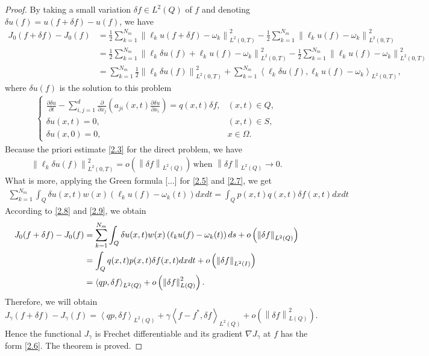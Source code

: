 \documentclass[]{article}
\begin{document}
\begin{proof}
	By taking a small variation $\delta f \in L^2(Q)$ of $f$ and denoting $\delta u(f)=u(f+\delta f)-u(f)$, we have
	\begin{align*}
		J_0(f+\delta f)-J_0(f)&=\frac{1}{2}\sum_{k=1}^{N_m}\left\|\ell_k u(f+\delta f)-\omega_k\right\|^2_{L^2(0, T)}-\frac{1}{2}\sum_{k=1}^{N_m}\left\|\ell_k u(f)-\omega_k\right\|^2_{L^2(0, T)}\\
		&=\frac{1}{2}\sum_{k=1}^{N_m}\left\|\ell_k \delta u(f) +\ell_k u(f)-\omega_k\right\|^2_{L^2(0, T)}-\frac{1}{2}\sum_{k=1}^{N_m}\left\|\ell_k u(f)-\omega_k\right\|^2_{L^2(0, T)}\\
		&=\sum_{k=1}^{N_m}\frac{1}{2}\left\|\ell_k \delta u(f)\right\|^2_{L^2(0, T)}+\sum_{k=1}^{N_m}\left\langle \ell_k \delta u(f), \ell_k u(f)-\omega_k\right\rangle_{L^2(0, T)},
	\end{align*}
	where $\delta u(f)$ is the solution to this problem
	\begin{align}\label{2.7}
		\begin{cases}
			\frac{\partial \delta u}{\partial t}-\sum\limits_{i, j=1}^{d}\frac{\partial}{\partial x_j}\left(a_{ji}(x, t)\frac{\partial \delta u}{\partial x_i}\right)=q(x, t)\delta f,&(x, t)\in Q,\\
			\delta u(x, t)=0, & (x, t)\in S,\\
			\delta u(x, 0)=0, &x\in \Omega.
		\end{cases}
	\end{align}
	Because the priori estimate \eqref{2.3} for the direct problem, we have
	\begin{align}\label{2.8}
		\left\|\ell_k\delta u(f)\right\|_{L^2(0, T)}^2=o\left(\left\|\delta f\right\|_{L^2(Q)}\right)\, \text{when } \left\|\delta f\right\|_{L^2(Q)}\to 0.
	\end{align}
	What is more, applying the Green formula [...] for \eqref{2.5} and \eqref{2.7}, we get
	\begin{align}\label{2.9}
		\sum_{k=1}^{N_m}\int_{Q} \delta u(x, t) w(x) \left(\ell_k u(f)-\omega_k(t)\right)dxdt=\int_{Q} p(x, t)q(x, t)\delta f(x, t)dxdt
	\end{align}
	According to \eqref{2.8} and \eqref{2.9}, we obtain
	\begin{align*}
		J_0(f+\delta f)-J_0(f)&=\sum_{k=1}^{N_m}\int_{Q}\delta u(x, t)w(x)\left(\ell_k u(f)-\omega_k(t)\right)ds+o\left(\left\|\delta f\right\|_{L^2(Q)}\right)\notag\\
		&=\int_Q q(x, t)p(x, t)\delta f(x, t)dxdt+o\left(\left\|\delta f\right\|_{L^2(I)}\right)\notag\\
		&=\left\langle qp,\delta f \right\rangle_{L^2(Q)}+o\left(\left\|\delta f\right\|^2_{L(Q)}\right).
	\end{align*}
	Therefore, we will obtain
	$$J_\gamma(f+\delta f)-J_\gamma(f)=\left\langle qp,\delta f \right\rangle_{L^2(Q)}+\gamma\left\langle f-f^*,\delta f \right\rangle_{L^2(Q)}+o\left(\left\|\delta f\right\|^2_{L(Q)}\right).$$
	Hence the functional $J_\gamma$ is Frechet differentiable and its gradient $\nabla J_\gamma$ at $f$ has the form \eqref{2.6}. The theorem is proved.
\end{proof}
\end{document}
